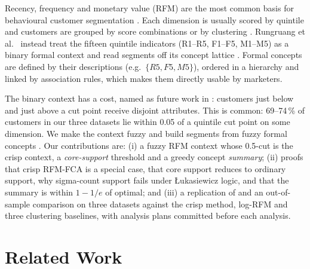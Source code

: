 \documentclass[conference]{IEEEtran}
\begin{document}
Recency, frequency and monetary value (RFM) are the most common basis for behavioural customer segmentation \cite{hughes1994,fader2005}. Each dimension is usually scored by quintile and customers are grouped by score combinations or by clustering \cite{chen2012,wedel2000}. Rungruang et al.\ \cite{rungruang2024} instead treat the fifteen quintile indicators (R1--R5, F1--F5, M1--M5) as a binary formal context and read segments off its concept lattice \cite{ganter1999}. Formal concepts are defined by their descriptions (e.g.\ $\{R5,F5,M5\}$), ordered in a hierarchy and linked by association rules, which makes them directly usable by marketers.

The binary context has a cost, named as future work in \cite{rungruang2024}: customers just below and just above a cut point receive disjoint attributes. This is common: 69--74\,\% of customers in our three datasets lie within 0.05 of a quintile cut point on some dimension. We make the context fuzzy and build segments from fuzzy formal concepts \cite{belohlavek2002,belohlavek2004}. Our contributions are: (i) a fuzzy RFM context whose 0.5-cut is the crisp context, a \emph{core-support} threshold and a greedy concept \emph{summary}; (ii) proofs that crisp RFM-FCA is a special case, that core support reduces to ordinary support, why sigma-count support fails under Łukasiewicz logic, and that the summary is within $1-1/e$ of optimal; and (iii) a replication of \cite{rungruang2024} and an out-of-sample comparison on three datasets against the crisp method, log-RFM and three clustering baselines, with analysis plans committed before each analysis.

\section{Related Work}
\end{document}
